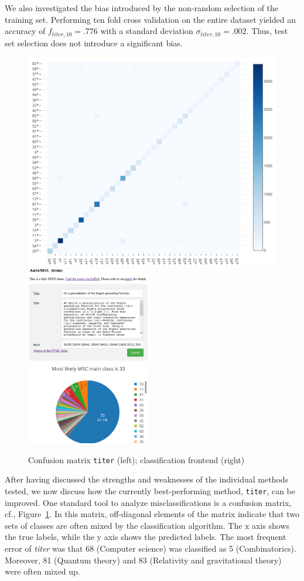 We also investigated the bias introduced by the non-random selection of the training set.
Performing ten fold cross validation on the entire dataset yielded an accuracy of \(f_{titer,10} = .776\) with a standard deviation \(\sigma_{titer,10} = .002.\)
Thus, test set selection does not introduce a significant bias.


\begin{figure}[t]
  \centering
  \includegraphics[width=.48\textwidth]{confusion.png}
  \includegraphics[width=0.48\textwidth]{webFrontend.png}
  \caption{Confusion matrix \texttt{titer} (left); classification frontend (right)}\label{fgScreenshot}\label{fgConfusion}
\end{figure}
After having discussed the strengths and weaknesses of the individual methods tested, we now discuss how the currently best-performing method, \texttt{titer}, can be improved.
One standard tool to analyze misclassifications is a confusion matrix, cf., Figure~\ref{fgConfusion}.
In this matrix, off-diagonal elements of the matrix indicate that two sets of classes are often mixed by the classification algorithm.
The x axis shows the true labels, while the y axis shows the predicted labels.
The most frequent error of \emph{titer} was that 68 (Computer science) was classified as 5 (Combinatorics).
Moreover, 81 (Quantum theory) and 83 (Relativity and gravitational theory) were often mixed up.


